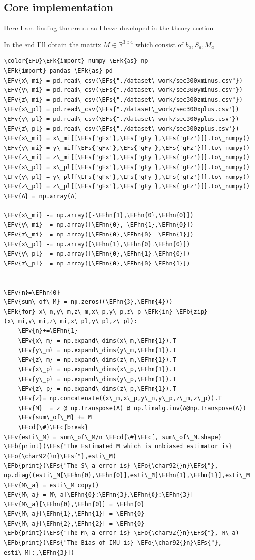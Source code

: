 \documentclass[11pt]{article}
\newcommand{\EFc}[1]{\textcolor{EFc}{#1}} %
\newcommand{\EFcd}[1]{\textcolor{EFcd}{#1}} %
\newcommand{\EFs}[1]{\textcolor{EFs}{#1}} %
\newcommand{\EFk}[1]{\textcolor{EFk}{#1}} %
\newcommand{\EFb}[1]{\textcolor{EFb}{#1}} %
\newcommand{\EFv}[1]{\textcolor{EFv}{#1}} %
\newcommand{\EFo}[1]{\textcolor{EFo}{#1}} %
\newcommand{\EFhn}[1]{\textcolor{EFhn}{#1}} %
\begin{document}
\subsection{Core implementation}
\label{sec:org983c710}
Here I am finding the errors as I have developed in the theory section

In the end I'll obtain the matrix \(M\in \mathbb{R}^{3\times 4}\) which consist of \(b_a,S_a,M_a\)

\begin{Code}
\begin{Verbatim}
\color{EFD}\EFk{import} numpy \EFk{as} np
\EFk{import} pandas \EFk{as} pd
\EFv{x\_mi} = pd.read\_csv(\EFs{"./dataset\_work/sec300xminus.csv"})
\EFv{y\_mi} = pd.read\_csv(\EFs{"./dataset\_work/sec300yminus.csv"})
\EFv{z\_mi} = pd.read\_csv(\EFs{"./dataset\_work/sec300zminus.csv"})
\EFv{x\_pl} = pd.read\_csv(\EFs{"./dataset\_work/sec300xplus.csv"})
\EFv{y\_pl} = pd.read\_csv(\EFs{"./dataset\_work/sec300yplus.csv"})
\EFv{z\_pl} = pd.read\_csv(\EFs{"./dataset\_work/sec300zplus.csv"})
\EFv{x\_mi} = x\_mi[[\EFs{'gFx'},\EFs{'gFy'},\EFs{'gFz'}]].to\_numpy()
\EFv{y\_mi} = y\_mi[[\EFs{'gFx'},\EFs{'gFy'},\EFs{'gFz'}]].to\_numpy()
\EFv{z\_mi} = z\_mi[[\EFs{'gFx'},\EFs{'gFy'},\EFs{'gFz'}]].to\_numpy()
\EFv{x\_pl} = x\_pl[[\EFs{'gFx'},\EFs{'gFy'},\EFs{'gFz'}]].to\_numpy()
\EFv{y\_pl} = y\_pl[[\EFs{'gFx'},\EFs{'gFy'},\EFs{'gFz'}]].to\_numpy()
\EFv{z\_pl} = z\_pl[[\EFs{'gFx'},\EFs{'gFy'},\EFs{'gFz'}]].to\_numpy()
\EFv{A} = np.array(A)

\EFv{x\_mi} -= np.array([-\EFhn{1},\EFhn{0},\EFhn{0}])
\EFv{y\_mi} -= np.array([\EFhn{0},-\EFhn{1},\EFhn{0}])
\EFv{z\_mi} -= np.array([\EFhn{0},\EFhn{0},-\EFhn{1}])
\EFv{x\_pl} -= np.array([\EFhn{1},\EFhn{0},\EFhn{0}])
\EFv{y\_pl} -= np.array([\EFhn{0},\EFhn{1},\EFhn{0}])
\EFv{z\_pl} -= np.array([\EFhn{0},\EFhn{0},\EFhn{1}])

    
\EFv{n}=\EFhn{0} 
\EFv{sum\_of\_M} = np.zeros((\EFhn{3},\EFhn{4}))
\EFk{for} x\_m,y\_m,z\_m,x\_p,y\_p,z\_p \EFk{in} \EFb{zip}(x\_mi,y\_mi,z\_mi,x\_pl,y\_pl,z\_pl):
    \EFv{n}+=\EFhn{1}
    \EFv{x\_m} = np.expand\_dims(x\_m,\EFhn{1}).T
    \EFv{y\_m} = np.expand\_dims(y\_m,\EFhn{1}).T
    \EFv{z\_m} = np.expand\_dims(z\_m,\EFhn{1}).T
    \EFv{x\_p} = np.expand\_dims(x\_p,\EFhn{1}).T
    \EFv{y\_p} = np.expand\_dims(y\_p,\EFhn{1}).T
    \EFv{z\_p} = np.expand\_dims(z\_p,\EFhn{1}).T
    \EFv{z}= np.concatenate((x\_m,x\_p,y\_m,y\_p,z\_m,z\_p)).T
    \EFv{M}  = z @ np.transpose(A) @ np.linalg.inv(A@np.transpose(A))
    \EFv{sum\_of\_M} += M
    \EFcd{\#}\EFc{break}
\EFv{esti\_M} = sum\_of\_M/n \EFcd{\#}\EFc{, sum\_of\_M.shape}
\EFb{print}(\EFs{"The Estimated M which is unbiased estimator is} \EFo{\char92{}n}\EFs{"},esti\_M)
\EFb{print}(\EFs{"The S\_a error is} \EFo{\char92{}n}\EFs{"}, np.diag((esti\_M[\EFhn{0},\EFhn{0}],esti\_M[\EFhn{1},\EFhn{1}],esti\_M[\EFhn{2},\EFhn{2}])))
\EFv{M\_a} = esti\_M.copy()
\EFv{M\_a} = M\_a[\EFhn{0}:\EFhn{3},\EFhn{0}:\EFhn{3}]
\EFv{M\_a}[\EFhn{0},\EFhn{0}] = \EFhn{0}
\EFv{M\_a}[\EFhn{1},\EFhn{1}] = \EFhn{0}
\EFv{M\_a}[\EFhn{2},\EFhn{2}] = \EFhn{0}
\EFb{print}(\EFs{"The M\_a error is} \EFo{\char92{}n}\EFs{"}, M\_a)
\EFb{print}(\EFs{"The Bias of IMU is} \EFo{\char92{}n}\EFs{"}, esti\_M[:,\EFhn{3}])


\end{Verbatim}
\end{Code}
\end{document}
